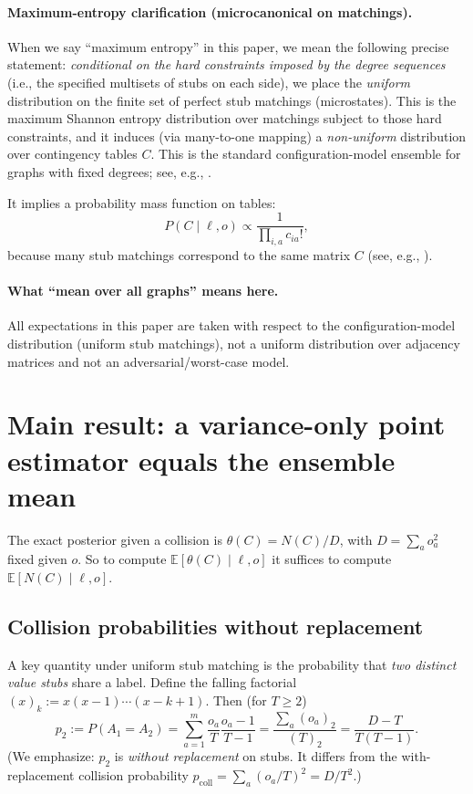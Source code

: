 \documentclass[11pt]{article}
\newcommand{\E}{\mathbb{E}}
\newcommand{\1}{\mathbf{1}}
\newcommand{\fall}[2]{\left(#1\right)_{#2}} %
\theoremstyle{plain}
\theoremstyle{definition}
\begin{document}
\paragraph{Maximum-entropy clarification (microcanonical on matchings).}
When we say ``maximum entropy'' in this paper, we mean the following precise statement:
\emph{conditional on the hard constraints imposed by the degree sequences} (i.e., the specified multisets of stubs on each side), we place the \emph{uniform} distribution on the finite set of perfect stub matchings (microstates).
This is the maximum Shannon entropy distribution over matchings subject to those hard constraints, and it induces (via many-to-one mapping) a \emph{non-uniform} distribution over contingency tables $C$.
This is the standard configuration-model ensemble for graphs with fixed degrees; see, e.g., \cite{jaynes1957,parknewman2004,garlaschelli2008,fosdick2018configuring,newman2010networks}.

It implies a probability mass function on tables:
\[
P(C\mid \ell,o) \propto \frac{1}{\prod_{i,a} c_{ia}!},
\]
because many stub matchings correspond to the same matrix $C$
(see, e.g., \cite{fosdick2018configuring,diaconisgangolli1995}).

\paragraph{What ``mean over all graphs'' means here.}
All expectations in this paper are taken with respect to the configuration-model distribution (uniform stub matchings), not a uniform distribution over adjacency matrices and not an adversarial/worst-case model.

\section{Main result: a variance-only point estimator equals the ensemble mean}

The exact posterior given a collision is $\theta(C)=N(C)/D$, with $D=\sum_a o_a^2$ fixed given $o$.
So to compute $\E[\theta(C)\mid \ell,o]$ it suffices to compute $\E[N(C)\mid \ell,o]$.

\subsection{Collision probabilities without replacement}
A key quantity under uniform stub matching is the probability that \emph{two distinct value stubs} share a label.
Define the falling factorial $\fall{x}{k} := x(x-1)\cdots(x-k+1)$.
Then (for $T\ge 2$)
\[
p_2 := P(A_1=A_2)
=
\sum_{a=1}^m \frac{o_a}{T}\frac{o_a-1}{T-1}
=
\frac{\sum_a \fall{o_a}{2}}{\fall{T}{2}}
=
\frac{D-T}{T(T-1)}.
\]
(We emphasize: $p_2$ is \emph{without replacement} on stubs. It differs from the with-replacement collision probability $p_{\text{coll}}=\sum_a (o_a/T)^2 = D/T^2$.)
\end{document}
